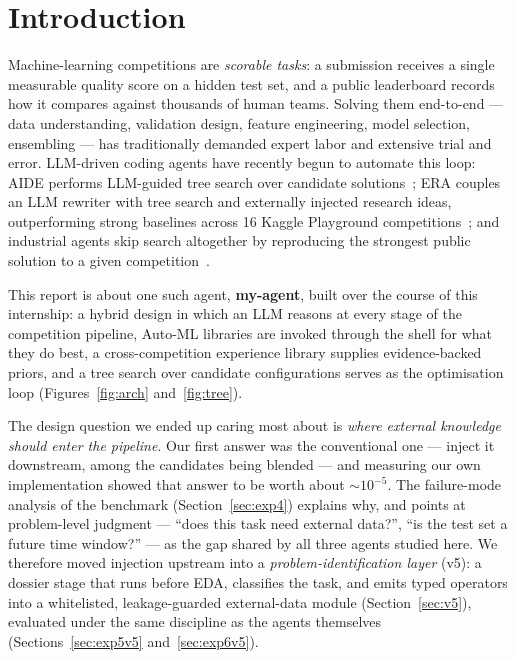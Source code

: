 \documentclass[11pt,a4paper]{article}
\begin{document}
\vspace{0.5em}

\section{Introduction}

Machine-learning competitions are \emph{scorable tasks}: a submission receives a single measurable quality score on a hidden test set, and a public leaderboard records how it compares against thousands of human teams. Solving them end-to-end --- data understanding, validation design, feature engineering, model selection, ensembling --- has traditionally demanded expert labor and extensive trial and error. LLM-driven coding agents have recently begun to automate this loop: AIDE performs LLM-guided tree search over candidate solutions~\cite{aide2025}; ERA couples an LLM rewriter with tree search and externally injected research ideas, outperforming strong baselines across 16 Kaggle Playground competitions~\cite{aygun2026}; and industrial agents skip search altogether by reproducing the strongest public solution to a given competition~\cite{nvidia2026}.

This report is about one such agent, \textbf{my-agent}, built over the course of this internship: a hybrid design in which an LLM reasons at every stage of the competition pipeline, Auto-ML libraries are invoked through the shell for what they do best, a cross-competition experience library supplies evidence-backed priors, and a tree search over candidate configurations serves as the optimisation loop (Figures~\ref{fig:arch} and~\ref{fig:tree}). 

The design question we ended up caring most about is \emph{where external knowledge should enter the pipeline}. Our first answer was the conventional one --- inject it downstream, among the candidates being blended --- and measuring our own implementation showed that answer to be worth about ${\sim}10^{-5}$. The failure-mode analysis of the benchmark (Section~\ref{sec:exp4}) explains why, and points at problem-level judgment --- ``does this task need external data?'', ``is the test set a future time window?'' --- as the gap shared by all three agents studied here. We therefore moved injection upstream into a \emph{problem-identification layer} (v5): a dossier stage that runs before EDA, classifies the task, and emits typed operators into a whitelisted, leakage-guarded external-data module (Section~\ref{sec:v5}), evaluated under the same discipline as the agents themselves (Sections~\ref{sec:exp5v5} and~\ref{sec:exp6v5}).
\end{document}
